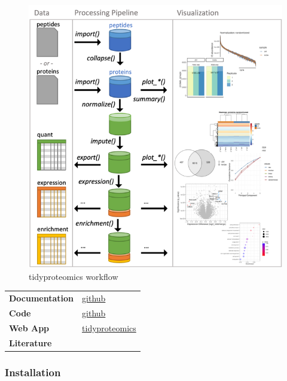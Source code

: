 \documentclass[
]{book}
\begin{document}
\begin{figure}

{\centering \includegraphics[width=9.17in]{images/10_001_tidyproteomics} 

}

\caption{\label{fig:10001}tidyproteomics workflow}\label{fig:10001}
\end{figure}

\begin{longtable}[]{@{}
  >{\raggedright\arraybackslash}p{}
  >{\raggedright\arraybackslash}p{}@{}}
\toprule\noalign{}
\endhead
\bottomrule\noalign{}
\endlastfoot
\textbf{Documentation} & \href{https://jeffsocal.github.io/tidyproteomics/}{github} \\
\textbf{Code} & \href{https://github.com/jeffsocal/tidyproteomics}{github} \\
\textbf{Web App} & \href{bioinformatics.pel.caltech.edu/tidyproteomics/}{tidyproteomics} \\
\textbf{Literature} & \\
\end{longtable}

\hypertarget{installation-5}{%
\subsubsection*{Installation}\label{installation-5}}
\end{document}
